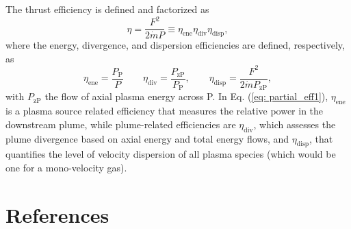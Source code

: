 \documentclass[%
 aip,
cha,
 amsmath,amssymb,
 reprint,%
]{revtex4-1}
\begin{document}
The thrust efficiency is defined and factorized as
\begin{equation}
\eta = \frac{F^2}{2\dot{m} P}
\equiv 
\eta_\mathrm{ene}\eta_\mathrm{div}\eta_\mathrm{disp},
\label{eq: thrust efficiency}
\end{equation}
where the energy, divergence, and dispersion efficiencies are defined, respectively, as
\begin{equation}
\eta_\mathrm{ene} =\frac{P_\mathrm{P}}{P}
\qquad
\eta_\mathrm{div} =\frac{P_\mathrm{zP}}{P_\mathrm{P}},
\qquad 
\eta_\mathrm{disp} = 
\frac{F^2}{2\dot{m} P_\mathrm{zP}},
\label{eq: partial_eff1}
\end{equation}
with $P_\mathrm{zP}$ the flow of axial plasma energy across P. In Eq. (\ref{eq: partial_eff1}), $\eta_\mathrm{ene}$ is a plasma source related efficiency that measures the relative power in the downstream plume, while plume-related efficiencies are $\eta_\mathrm{div}$, which assesses the plume divergence based on axial energy and total energy flows, and $\eta_\mathrm{disp}$, that quantifies the level of velocity dispersion of all plasma species (which would be one for a mono-velocity gas).



\section*{References}



\end{document}
